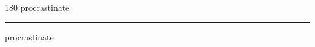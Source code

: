 
\begin{frame}
\begin{center}
\begin{turn}{180}
{\fontsize{2.5cm}{1em}\selectfont procrastinate}
\end{turn}
\vspace{1em}\par  
\hrule
\vspace{1em}\par  
{\fontsize{2.5cm}{1em}\selectfont procrastinate}
\end{center}
\end{frame}

